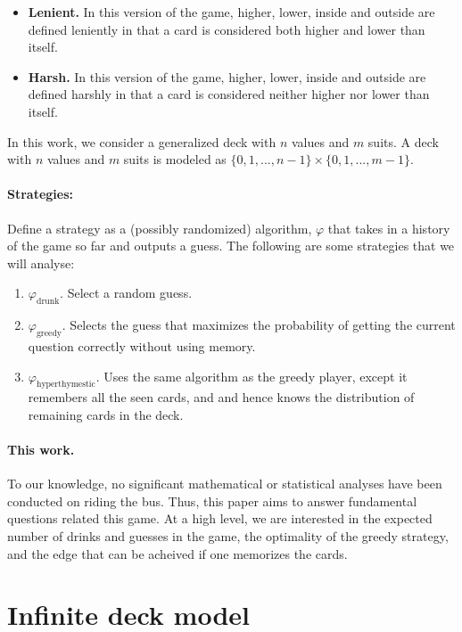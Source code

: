 \documentclass[12pt]{article}
\theoremstyle{definition}
\begin{document}
\begin{itemize}
    \item \textbf{Lenient.} In this version of the game, higher, lower, inside and outside are defined leniently in that a card is considered both higher and lower than itself.
    \item \textbf{Harsh.} In this version of the game, higher, lower, inside and outside are defined harshly in that a card is considered neither higher nor lower than itself.
\end{itemize}

In this work, we consider a generalized deck with $n$ values and $m$ suits. A deck with $n$ values and $m$ suits is modeled as $\{0,1,...,n-1\} \times \{0, 1, ...,m-1\}$. 

\paragraph{Strategies: } Define a strategy as a (possibly randomized) algorithm, $\varphi$ that takes in a history of the game so far and outputs a guess. The following are some strategies that we will analyse:
\begin{enumerate}
    \item $\varphi_{\text{drunk}}$. Select a random guess.
    \item $\varphi_{\text{greedy}}$. Selects the guess that maximizes the probability of getting the current question correctly without using memory.
    \item $\varphi_{\text{hyperthymestic}}$. Uses the same algorithm as the greedy player, except it remembers all the seen cards, and and hence knows the distribution of remaining cards in the deck.
\end{enumerate}

\paragraph{This work.} To our knowledge, no significant mathematical or statistical analyses have been conducted on riding the bus. Thus, this paper aims to answer fundamental questions related this game. At a high level, we are interested in the expected number of drinks and guesses in the game, the optimality of the greedy strategy, and the edge that can be acheived if one memorizes the cards.


\section{Infinite deck model}
\end{document}
